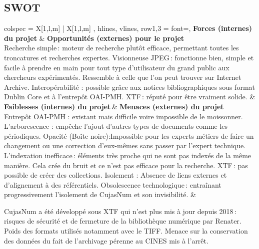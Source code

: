 \subsection{SWOT}

\begin{table}[H]
\centering
\caption{Analyse SWOT de CujasNum}
\label{tab:swot_cujasnum}
\vspace{0.3cm}
\begin{tblr}{
	colspec = { X[1,l,m] | X[1,l,m] },
	hlines,
	vlines,
	row{1,3} = {font=\bfseries},%
	}
	\textbf{Forces (internes) du projet} & \textbf{Opportunités (externes) pour le projet} \\
	
	Recherche simple : moteur de recherche plutôt efficace, permettant toutes les troncatures et recherches expertes.
	Visionneuse JPEG : fonctionne bien, simple et facile à prendre en main pour tout type d’utilisateur du grand public aux chercheurs expérimentés. Ressemble à celle que l’on peut trouver sur Internet Archive.
	Interopérabilité : possible grâce aux notices bibliographiques sous format Dublin Core et à l’entrepôt OAI-PMH.
	XTF : réputé pour être vraiment solide.
	&
	 \\
	
	\textbf{Faiblesses (internes) du projet} & \textbf{Menaces (externes) du projet} \\ 
	
	Entrepôt OAI-PMH : existant mais difficile voire impossible de le moissonner. 
	L’arborescence : empêche l’ajout d’autres types de documents comme les périodiques.
	Opacité (Boîte noire):Impossible pour les experts métiers de faire un changement ou une correction d’eux-mêmes sans  passer par l’expert technique.
	L’indexation inefficace : éléments très proche qui ne sont pas indexés de la même manière. Cela crée du bruit et ce n’est pas efficace pour la recherche.
	XTF : pas possible de créer des collections.
	Isolement : Absence de liens externes et d’alignement à des référentiels.
	Obsolescence technologique : entraînant progressivement l’isolement de CujasNum et son invisibilité.
	&
	
	CujasNum a été développé sous XTF qui n’est plus mis à jour depuis 2018 : risques de sécurité et de fermeture de la bibliothèque numérique par Renater.
	Poids des formats utilisés notamment avec le TIFF.
	Menace sur la conservation des données du fait de l’archivage pérenne au CINES mis à l’arrêt.\\
	
	\end{tblr}
\end{table}

